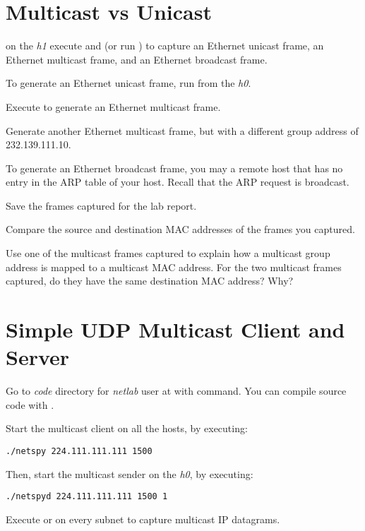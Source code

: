 \documentclass{../UTNetLab}
\begin{document}
\section{Multicast vs Unicast}
    on the \textit{h1} execute  and  (or run ) to capture an Ethernet unicast frame, an Ethernet multicast frame, and an Ethernet broadcast frame.

    To generate an Ethernet unicast frame, run  from the \textit{h0}.

    Execute  to generate an Ethernet multicast frame.

    Generate another Ethernet multicast frame, but with a different group address of {232.139.111.10}.

    To generate an Ethernet broadcast frame, you may  a remote host that has no entry in the ARP table of your host.
    Recall that the ARP request is broadcast.

    Save the frames captured for the lab report.

    \begin{report}
        \item Compare the source and destination MAC addresses of the frames you captured.

        \item Use one of the multicast frames captured to explain how a multicast group address is mapped to a multicast MAC address.
            For the two multicast frames captured, do they have the same destination MAC address?
            Why?
    \end{report}

\section{Simple UDP Multicast Client and Server}
    Go to \textit{code} directory for \textit{netlab} user at  with  command.
    You can compile source code with .

    Start the multicast client  on all the hosts, by executing:
    \begin{lstlisting}
./netspy 224.111.111.111 1500
    \end{lstlisting}
    Then, start the multicast sender  on the \textit{h0}, by executing:
    \begin{lstlisting}
./netspyd 224.111.111.111 1500 1
    \end{lstlisting}
    Execute  or  on every subnet to capture multicast IP datagrams.
\end{document}
